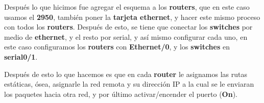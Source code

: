 Después lo que hicimos fue agregar el esquema a los \textbf{routers}, que en
este caso usamos el \textbf{2950}, también poner la \textbf{tarjeta ethernet},
y hacer este mismo proceso con todos los \textbf{routers}. Después de esto, se
tiene que conectar los \textbf{switches} por medio de \textbf{ethernet}, y el
resto por serial, y así mismo configurar cada uno, en este caso configuramos
los \textbf{routers} con \textbf{Ethernet/0}, y los \textbf{switches} en
\textbf{serial0/1}.

Después de esto lo que hacemos es que en cada \textbf{router} le asignamos las
rutas estáticas, ósea, asignarle la red remota y su dirección IP a la cual se le
enviaran los paquetes hacia otra red, y por último activar/encender el puerto
(\textbf{On}).
